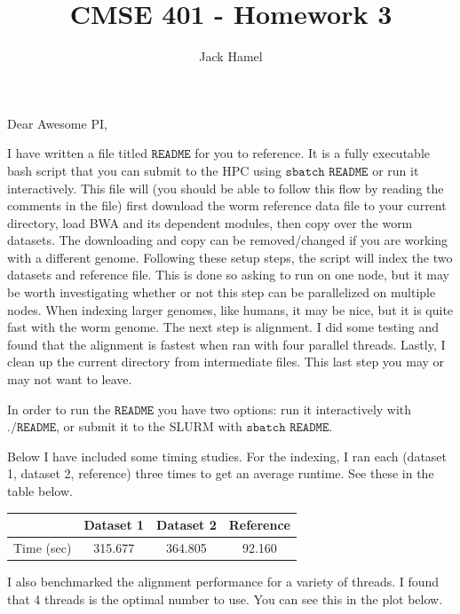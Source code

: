 \documentclass[letterpaper,11pt]{article}
\title{CMSE 401 - Homework 3}
\author{Jack Hamel}
\begin{document}
\maketitle

Dear Awesome PI,\newline

I have written a file titled $\texttt{README}$ for you to reference.  It is a fully executable bash script that you can submit to the HPC using $\texttt{sbatch README}$ or run it interactively.  This file will (you should be able to follow this flow by reading the comments in the file) first download the worm reference data file to your current directory, load BWA and its dependent modules, then copy over the worm datasets.  The downloading and copy can be removed/changed if you are working with a different genome.  Following these setup steps, the script will index the two datasets and reference file.  This is done so asking to run on one node, but it may be worth investigating whether or not this step can be parallelized on multiple nodes.  When indexing larger genomes, like humans, it may be nice, but it is quite fast with the worm genome.  The next step is alignment.  I did some testing and found that the alignment is fastest when ran with four parallel threads.  Lastly, I clean up the current directory from intermediate files.  This last step you may or may not want to leave.  

In order to run the $\texttt{README}$ you have two options: run it interactively with $\texttt{./README}$, or submit it to the SLURM with $\texttt{sbatch README}$.

Below I have included some timing studies.  For the indexing, I ran each (dataset 1, dataset 2, reference) three times to get an average runtime.  See these in the table below.

\begin{center}
 \begin{tabular}{||c c c c||}
 \hline
 & Dataset 1 & Dataset 2 & Reference \\[1.5ex]
 \hline
 Time (sec) & 315.677 & 364.805 & 92.160 \\
 \hline
\end{tabular}
\end{center}

\newpage
I also benchmarked the alignment performance for a variety of threads.  I found that 4 threads is the optimal number to use.  You can see this in the plot below.
\end{document}
